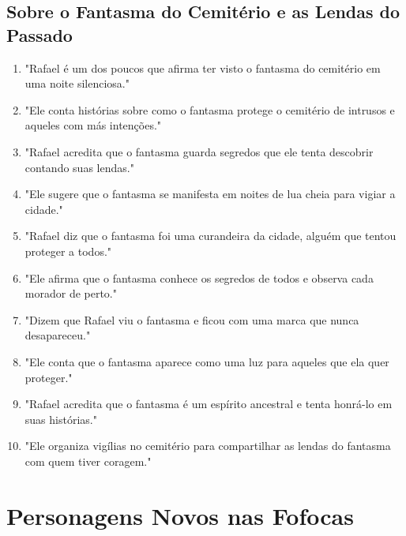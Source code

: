 \subsection*{Sobre o Fantasma do Cemitério e as Lendas do Passado}
\begin{enumerate}
    \item "Rafael é um dos poucos que afirma ter visto o fantasma do cemitério em uma noite silenciosa."
    \item "Ele conta histórias sobre como o fantasma protege o cemitério de intrusos e aqueles com más intenções."
    \item "Rafael acredita que o fantasma guarda segredos que ele tenta descobrir contando suas lendas."
    \item "Ele sugere que o fantasma se manifesta em noites de lua cheia para vigiar a cidade."
    \item "Rafael diz que o fantasma foi uma curandeira da cidade, alguém que tentou proteger a todos."
    \item "Ele afirma que o fantasma conhece os segredos de todos e observa cada morador de perto."
    \item "Dizem que Rafael viu o fantasma e ficou com uma marca que nunca desapareceu."
    \item "Ele conta que o fantasma aparece como uma luz para aqueles que ela quer proteger."
    \item "Rafael acredita que o fantasma é um espírito ancestral e tenta honrá-lo em suas histórias."
    \item "Ele organiza vigílias no cemitério para compartilhar as lendas do fantasma com quem tiver coragem."
\end{enumerate}

\section{Personagens Novos nas Fofocas}


